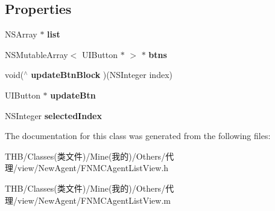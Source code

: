 \subsection*{Properties}
\begin{DoxyCompactItemize}
\item 
\mbox{\label{interface_f_n_m_c_agent_list_view_a6561f52d757c575c8d0dd12efd1a360c}} 
N\+S\+Array $\ast$ {\bfseries list}
\item 
\mbox{\label{interface_f_n_m_c_agent_list_view_a33cb67417672463bd3814728e65e8355}} 
N\+S\+Mutable\+Array$<$ U\+I\+Button $\ast$ $>$ $\ast$ {\bfseries btns}
\item 
\mbox{\label{interface_f_n_m_c_agent_list_view_a8a74cb4007de1f4728bd2c1497ab49f3}} 
void($^\wedge$ {\bfseries update\+Btn\+Block} )(N\+S\+Integer index)
\item 
\mbox{\label{interface_f_n_m_c_agent_list_view_a69214c3baaf199144f814b8757275b21}} 
U\+I\+Button $\ast$ {\bfseries update\+Btn}
\item 
\mbox{\label{interface_f_n_m_c_agent_list_view_a77016f7fc63932aa48b16ffc7c9554e4}} 
N\+S\+Integer {\bfseries selected\+Index}
\end{DoxyCompactItemize}


The documentation for this class was generated from the following files\+:\begin{DoxyCompactItemize}
\item 
T\+H\+B/\+Classes(类文件)/\+Mine(我的)/\+Others/代理/view/\+New\+Agent/F\+N\+M\+C\+Agent\+List\+View.\+h\item 
T\+H\+B/\+Classes(类文件)/\+Mine(我的)/\+Others/代理/view/\+New\+Agent/F\+N\+M\+C\+Agent\+List\+View.\+m\end{DoxyCompactItemize}
